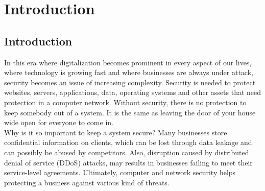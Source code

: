 \chapter{Introduction}
\label{cha:10}
%


\section{Introduction}

In this era where digitalization becomes prominent in every aspect of our lives, where technology is growing fast and where businesses are always under attack, security becomes an issue of increasing complexity. Security is needed to protect websites, servers, applications, data, operating systems and other assets that need protection in a computer network. Without security, there is no protection to keep somebody out of a system. It is the same as leaving the door of your house wide open for everyone to come in. \\

Why is it so important to keep a system secure?  Many businesses store confidential information on clients, which can be lost through data leakage and can possibly be abused by competitors. Also, disruption caused by distributed denial of service (DDoS) attacks, may results in businesses failing to meet their service-level agreements. Ultimately, computer and network security helps protecting a business against various kind of threats. \\

